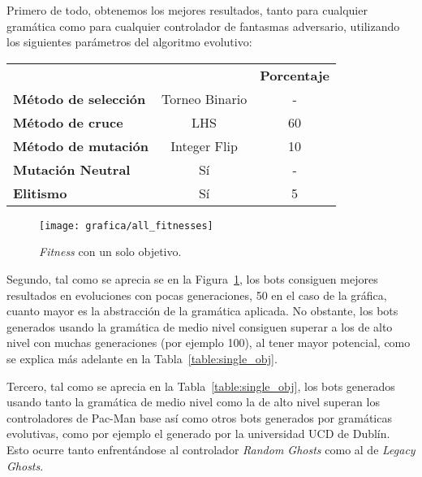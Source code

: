Primero de todo, obtenemos los mejores resultados, tanto para cualquier gramática como para cualquier controlador de fantasmas adversario, utilizando los siguientes parámetros del algoritmo evolutivo:
\begin{table}[H]
\centering
\begin{tabular}{lcc}
\cline{3-3}
                                                   &                                                               & \textbf{Porcentaje} \\ \cline{3-3} 
\multicolumn{1}{|l|}{\textbf{Método de selección}} & Torneo Binario \footnotemark & -                   \\
\multicolumn{1}{|l|}{\textbf{Método de cruce}}     & LHS                                                           & 60                  \\
\multicolumn{1}{|l|}{\textbf{Método de mutación}}  & Integer Flip                                                  & 10                  \\
\multicolumn{1}{|l|}{\textbf{Mutación Neutral}}    & Sí                                                            & -                   \\
\multicolumn{1}{|l|}{\textbf{Elitismo}}            & Sí                                                            & 5                  
\end{tabular}
\end{table}
\begin{figure}[]
\centering
\texttt{[image: grafica/all\_fitnesses]}
\label{graph:all_fitness}
\caption{\textit{Fitness} con un solo objetivo.}
\end{figure}

Segundo, tal como se aprecia se en la Figura~\ref{graph:all_fitness}, los bots consiguen mejores resultados en evoluciones con pocas generaciones, 50 en el caso de la gráfica, cuanto mayor es la abstracción de la gramática aplicada. No obstante, los bots generados usando la gramática de medio nivel consiguen superar a los de alto nivel con muchas generaciones (por ejemplo 100), al tener mayor potencial, como se explica más adelante en la Tabla~\ref{table:single_obj}.
 
Tercero, tal como se aprecia en la Tabla~\ref{table:single_obj}, los bots generados usando tanto la gramática de medio nivel como la de alto nivel superan los controladores de Pac-Man base así como otros bots generados por gramáticas evolutivas, como por ejemplo el generado por la universidad UCD de Dublín. Esto ocurre tanto enfrentándose al controlador \textit{Random Ghosts} como al de \textit{Legacy Ghosts}.
 
